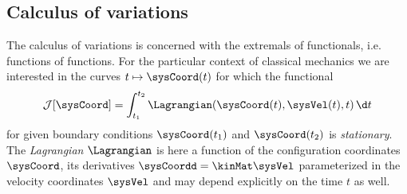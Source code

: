 \subsection{Calculus of variations}
The calculus of variations is concerned with the extremals of functionals, i.e. functions of functions. %
For the particular context of classical mechanics we are interested in the curves $t \mapsto \sysCoord(t)$ for which the functional
\begin{align}\label{eq:Functional}
 \mathcal{J}[\sysCoord] = \int_{t_1}^{t_2} \Lagrangian(\sysCoord(t), \sysVel(t), t) \, \d t
\end{align}
for given boundary conditions $\sysCoord(t_1)$ and $\sysCoord(t_2)$ is \textit{stationary}.
The \textit{Lagrangian} $\Lagrangian$ is here a function of the configuration coordinates $\sysCoord$, its derivatives $\sysCoordd = \kinMat \sysVel$ parameterized in the velocity coordinates $\sysVel$ and may depend explicitly on the time $t$ as well.

